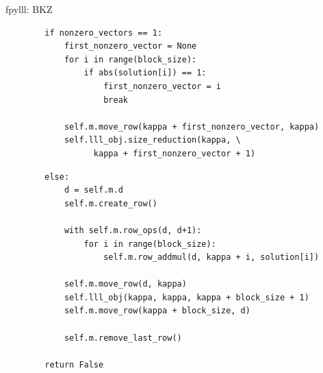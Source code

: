 \documentclass[presentation,smaller]{beamer}
\begin{document}
\begin{frame}{fpylll: BKZ}
\begin{lstlisting}
        if nonzero_vectors == 1:
            first_nonzero_vector = None
            for i in range(block_size):
                if abs(solution[i]) == 1:
                    first_nonzero_vector = i
                    break

            self.m.move_row(kappa + first_nonzero_vector, kappa)
            self.lll_obj.size_reduction(kappa, \
                  kappa + first_nonzero_vector + 1)
\end{lstlisting}

\framebreak

\lstset{language=sage,label= ,caption= ,captionpos=b,numbers=none}
\begin{lstlisting}
        else:
            d = self.m.d
            self.m.create_row()

            with self.m.row_ops(d, d+1):
                for i in range(block_size):
                    self.m.row_addmul(d, kappa + i, solution[i])

            self.m.move_row(d, kappa)
            self.lll_obj(kappa, kappa, kappa + block_size + 1)
            self.m.move_row(kappa + block_size, d)

            self.m.remove_last_row()

        return False
\end{lstlisting}
\end{frame}
\end{document}
